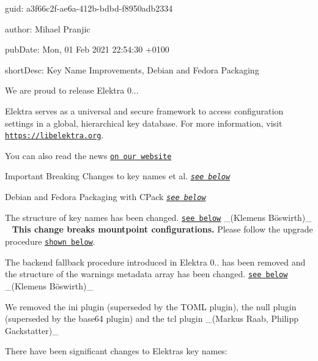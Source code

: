 
\begin{DoxyItemize}
\item guid\+: a3f66c2f-\/ae6a-\/412b-\/bdbd-\/f8950adb2334
\item author\+: Mihael Pranjic
\item pub\+Date\+: Mon, 01 Feb 2021 22\+:54\+:30 +0100
\item short\+Desc\+: Key Name Improvements, Debian and Fedora Packaging
\end{DoxyItemize}

We are proud to release Elektra 0...

Elektra serves as a universal and secure framework to access configuration settings in a global, hierarchical key database. For more information, visit \href{https://libelektra.org}{\tt https\+://libelektra.\+org}.

You can also read the news \href{https://www.libelektra.org/news/0.9.4-release}{\tt on our website}


\begin{DoxyItemize}
\item Important Breaking Changes to key names et al. {\itshape \href{#hl-1}{\tt see below}}
\item Debian and Fedora Packaging with C\+Pack {\itshape \href{#hl-2}{\tt see below}}
\end{DoxyItemize}


\begin{DoxyItemize}
\item The structure of key names has been changed. \href{#br-1}{\tt see below} \+\_\+(Klemens Böswirth)\+\_\+ ~\newline
 {\bfseries This change breaks mountpoint configurations.} Please follow the upgrade procedure \href{#mountpoint-upgrade}{\tt shown below}.
\item The backend fallback procedure introduced in Elektra 0.. has been removed and the structure of the {\ttfamily warnings} metadata array has been changed. \href{#br-2}{\tt see below} \+\_\+(Klemens Böswirth)\+\_\+
\item We removed the {\ttfamily ini} plugin (superseded by the T\+O\+ML plugin), the {\ttfamily null} plugin (superseded by the base64 plugin) and the {\ttfamily tcl} plugin \+\_\+(\+Markus Raab, Philipp Gackstatter)\+\_\+
\end{DoxyItemize}

There have been significant changes to Elektra\textquotesingle{}s key names\+:


